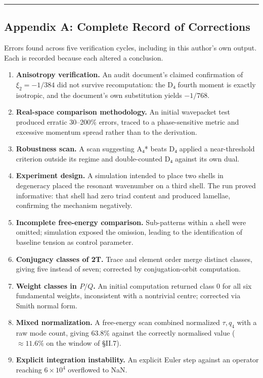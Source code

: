 \documentclass[a4paper,11pt]{article}
\begin{document}
\medskip\hrule\medskip

\subsection*{Appendix A: Complete Record of Corrections}

Errors found across five verification cycles, including in this author's own output. Each is recorded because each altered a conclusion.

\begin{enumerate}
\item \textbf{Anisotropy verification.} An audit document's claimed confirmation of $\xi_2=-1/384$ did not survive recomputation: the D₄ fourth moment is exactly isotropic, and the document's own substitution yields $-1/768$.
\item \textbf{Real-space comparison methodology.} An initial wavepacket test produced erratic 30–200\% errors, traced to a phase-sensitive metric and excessive momentum spread rather than to the derivation.
\item \textbf{Robustness scan.} A scan suggesting A₄* beats D₄ applied a near-threshold criterion outside its regime and double-counted D₄ against its own dual.
\item \textbf{Experiment design.} A simulation intended to place two shells in degeneracy placed the resonant wavenumber on a third shell. The run proved informative: that shell had zero triad content and produced lamellae, confirming the mechanism negatively.
\item \textbf{Incomplete free-energy comparison.} Sub-patterns within a shell were omitted; simulation exposed the omission, leading to the identification of baseline tension as control parameter.
\item \textbf{Conjugacy classes of 2T.} Trace and element order merge distinct classes, giving five instead of seven; corrected by conjugation-orbit computation.
\item \textbf{Weight classes in $P/Q$.} An initial computation returned class 0 for all six fundamental weights, inconsistent with a nontrivial centre; corrected via Smith normal form.
\item \textbf{Mixed normalization.} A free-energy scan combined normalized $\tau,q_4$ with a raw mode count, giving 63.8\% against the correctly normalised value ($\approx11.6\%$ on the window of §II.7).
\item \textbf{Explicit integration instability.} An explicit Euler step against an operator reaching $6\times10^4$ overflowed to NaN.

\end{enumerate}
\end{document}
